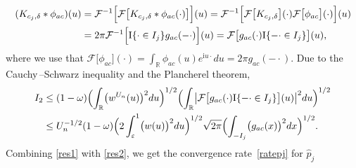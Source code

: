 \documentclass[numbers,webpdf,imaiai]{ima-authoring-template}%
\theoremstyle{thmstyletwo}%
\newcommand{\R}{\mathbb{R}}
\newcommand{\F}{\mathcal{F}}
\newcommand{\I}{{\mathrm{I}}}
\renewcommand{\i}{\mathrm{i}}
\newcommand{\w}{\omega}
\newcommand{\eps}{\varepsilon}
\numberwithin{equation}{section}
\begin{document}
\begin{enumerate}
\begin{align}\nonumber
(K_{c_j,\delta} * \phi_{ac})(u) &= \F^{-1} \Bigl[ \F\bigl[
K_{c_j,\delta} * \phi_{ac}(\cdot)
\bigr] \Bigr] (u )
= \F^{-1} \Bigl[ \F\bigl[
K_{c_j,\delta} \bigr](\cdot) \F\bigl[ \phi_{ac}
\bigr](\cdot) \Bigr] (u)\\ \label{phiac}
&= 2\pi \F^{-1} \Bigl[  \I\{\cdot \in I_j\}  g_{ac}(-\cdot) \Bigr] (u) = \F\bigl[ g_{ac}(\cdot)  \I\{-\cdot\in I_j\} \bigr](u),
\end{align}
where we use that \(\F\bigl[ \phi_{ac}
\bigr](\cdot) = \int_{\R} \phi_{ac}(u) e^{\i u \cdot} du = 2\pi g_{ac}(-\cdot).\) Due to the Cauchy\,--\;Schwarz inequality and the Plancherel theorem, 
\begin{align}\nonumber
I_2 &\leq (1-\w) \Bigl(\int_{\R} \bigl(w^{U_n} (u) \bigr)^2 du\Bigr)^{1/2}
\Bigl(
\int_{\R} \bigl|
\F\bigl[ g_{ac}(\cdot)  \I\{-\cdot\in I_j\} \bigr](u)\bigr|^2 du
\Bigr)^{1/2}\\
\label{res2}
&\leq
U_n^{-1/2} (1-\w)
\Bigl(2 \int_{\eps}^1 \bigl(w (u) \bigr)^2 du\Bigr)^{1/2}
\sqrt{2 \pi}  \Bigl(
\int_{-I_j} 
\bigl( g_{ac}(x)  \bigr)^2 dx
\Bigr)^{1/2}.
\end{align}
Combining \eqref{res1} with \eqref{res2}, we get the  convergence rate~\eqref{ratepj} for $\widehat{p}_j$



\end{enumerate}
\end{document}
